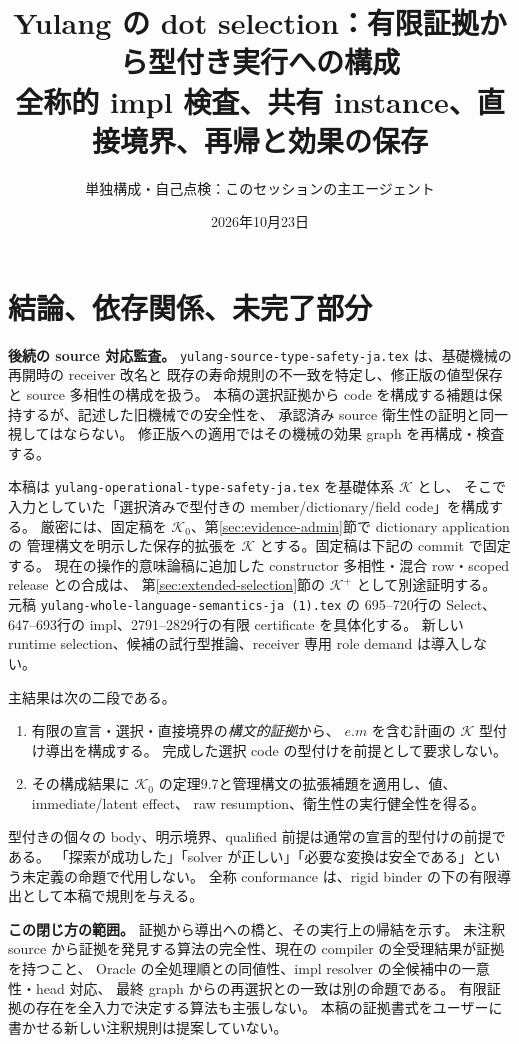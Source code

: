 \documentclass[11pt,a4paper]{article}
\title{Yulang の dot selection：有限証拠から型付き実行への構成\\
\large 全称的 impl 検査、共有 instance、直接境界、再帰と効果の保存}
\author{単独構成・自己点検：このセッションの主エージェント}
\date{2026年10月23日}
\newcommand{\Core}{\mathcal K}
\begin{document}
\maketitle

\section*{結論、依存関係、未完了部分}

\textbf{後続の source 対応監査。}
\nolinkurl{yulang-source-type-safety-ja.tex} は、基礎機械の再開時の receiver 改名と
既存の寿命規則の不一致を特定し、修正版の値型保存と source 多相性の構成を扱う。
本稿の選択証拠から code を構成する補題は保持するが、記述した旧機械での安全性を、
承認済み source 衛生性の証明と同一視してはならない。
修正版への適用ではその機械の効果 graph を再構成・検査する。

本稿は \nolinkurl{yulang-operational-type-safety-ja.tex} を基礎体系 \(\Core\) とし、
そこで入力としていた「選択済みで型付きの member/dictionary/field code」を構成する。
厳密には、固定稿を \(\Core_0\)、第\ref{sec:evidence-admin}節で dictionary application の
管理構文を明示した保存的拡張を \(\Core\) とする。固定稿は下記の commit で固定する。
現在の操作的意味論稿に追加した constructor 多相性・混合 row・scoped release との合成は、
第\ref{sec:extended-selection}節の \(\Core^+\) として別途証明する。
元稿 \nolinkurl{yulang-whole-language-semantics-ja (1).tex} の
695--720行の Select、647--693行の impl、2791--2829行の有限 certificate を具体化する。
新しい runtime selection、候補の試行型推論、receiver 専用 role demand は導入しない。

主結果は次の二段である。
\begin{enumerate}
\item 有限の宣言・選択・直接境界の\emph{構文的証拠}から、
      \(e.m\) を含む計画の \(\Core\) 型付け導出を構成する。
      完成した選択 code の型付けを前提として要求しない。
\item その構成結果に \(\Core_0\) の定理9.7と管理構文の拡張補題を適用し、値、immediate/latent effect、
      raw resumption、衛生性の実行健全性を得る。
\end{enumerate}
型付きの個々の body、明示境界、qualified 前提は通常の宣言的型付けの前提である。
「探索が成功した」「solver が正しい」「必要な変換は安全である」という未定義の命題で代用しない。
全称 conformance は、rigid binder の下の有限導出として本稿で規則を与える。

\textbf{この閉じ方の範囲。}
証拠から導出への橋と、その実行上の帰結を示す。
未注釈 source から証拠を発見する算法の完全性、現在の compiler の全受理結果が証拠を持つこと、
Oracle の全処理順との同値性、impl resolver の全候補中の一意性・head 対応、
最終 graph からの再選択との一致は別の命題である。
有限証拠の存在を全入力で決定する算法も主張しない。
本稿の証拠書式をユーザーに書かせる新しい注釈規則は提案していない。
\end{document}
